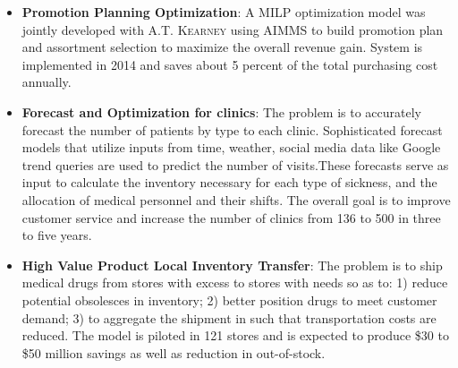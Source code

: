 \documentclass[12pt,letterpaper,roman]{moderncv} %
\begin{document}
{} %
{

\begin{itemize}
\item \textbf{Promotion Planning Optimization}: A MILP optimization model was
jointly developed with \textsc{A.T. Kearney} using AIMMS to build promotion plan and
assortment selection to maximize the overall revenue gain. System is
implemented in 2014 and saves about 5 percent of the total purchasing cost annually.
\item \textbf{Forecast and Optimization for clinics}: The problem is
to accurately forecast the number of patients by type to each clinic.
Sophisticated forecast models that utilize inputs from time, weather, social
media data like Google trend queries are used to predict the number of
visits.These forecasts serve as input to calculate the inventory necessary for
each type of sickness, and the allocation of medical personnel and their
shifts. The overall goal is to improve customer service and increase the number
of clinics from 136 to 500 in three to five years.
\item \textbf{High Value Product Local Inventory Transfer}:  The problem is to ship 
medical drugs from stores with excess to stores with needs so as to: 1) reduce
potential obsolesces in inventory; 2) better position drugs to meet customer
demand; 3) to aggregate the shipment in such that transportation costs are
reduced. The model is piloted in 121 stores and is expected
to produce \$30 to \$50 million savings as well as reduction in
out-of-stock.
 


\end{itemize}

}
\end{document}
